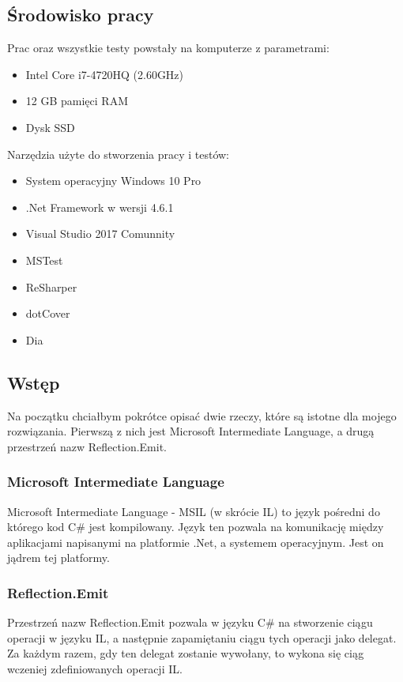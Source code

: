 \documentclass[12pt]{article}
\begin{document}
\subsection{Środowisko pracy}
Prac oraz wszystkie testy powstały na komputerze z parametrami:
\begin{itemize}
	\item Intel Core i7-4720HQ (2.60GHz)
	\item 12 GB pamięci RAM
	\item Dysk SSD
\end{itemize}
Narzędzia użyte do stworzenia pracy i testów:
\begin{itemize}
	\item System operacyjny Windows 10 Pro
	\item .Net Framework w wersji 4.6.1
	\item Visual Studio 2017 Comunnity
	\item MSTest
	\item ReSharper
	\item dotCover
	\item Dia
\end{itemize}


\subsection{Wstęp}
Na początku chciałbym pokrótce opisać dwie rzeczy, które są istotne dla mojego rozwiązania. Pierwszą z nich jest Microsoft Intermediate Language, a drugą przestrzeń nazw Reflection.Emit.

\subsubsection{Microsoft Intermediate Language}
Microsoft Intermediate Language - MSIL (w skrócie IL) to język pośredni do którego kod C\# jest kompilowany. Język ten pozwala na komunikację między aplikacjami napisanymi na platformie .Net, a systemem operacyjnym. Jest on jądrem tej platformy.

\subsubsection{Reflection.Emit}
Przestrzeń nazw Reflection.Emit pozwala w języku C\# na stworzenie ciągu operacji w języku IL, a następnie zapamiętaniu ciągu tych operacji jako delegat. Za każdym razem, gdy ten delegat zostanie wywołany, to wykona się ciąg wczeniej zdefiniowanych operacji IL.
\end{document}
